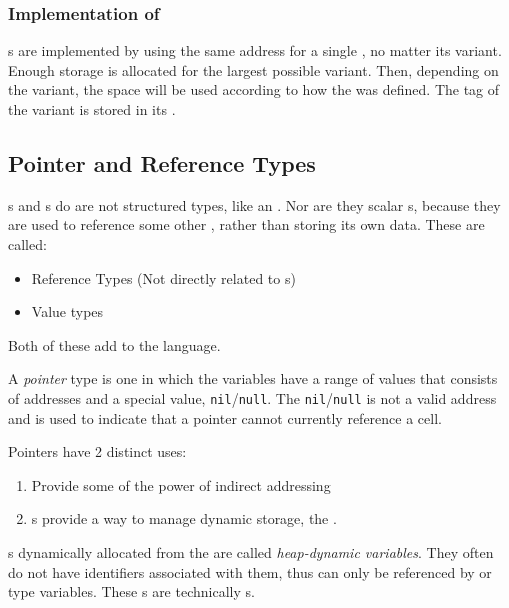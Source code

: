 \subsubsection{Implementation of }\label{subsubsec:Union_Types-Implementation}
s are implemented by using the same address for a single , no matter its variant.
Enough storage is allocated for the largest possible variant.
Then, depending on the variant, the space will be used according to how the  was defined.
The tag of the  variant is stored in its .

\subsection{Pointer and Reference Types}\label{subsec:Pointer_Reference_Types}
s and s do are not structured types, like an .
Nor are they scalar s, because they are used to reference some other , rather than storing its own data.
These are called:
\begin{itemize}[noitemsep]
\item Reference Types (Not directly related to s)
\item Value types
\end{itemize}
Both of these add  to the language.

\begin{definition}[Pointer]\label{def:Pointer}
  A \emph{pointer} type is one in which the variables have a range of values that consists of  addresses and a special value, \texttt{nil}/\texttt{null}.
  The \texttt{nil}/\texttt{null} is not a valid address and is used to indicate that a pointer cannot currently reference a  cell.

  Pointers have 2 distinct uses:
  \begin{enumerate}[noitemsep]
  \item Provide some of the power of indirect addressing
  \item {}s provide a way to manage dynamic storage, the .
  \end{enumerate}
\end{definition}

\begin{definition}\label{def:Heap_Dynamic_Variable}
  s dynamically allocated from the  are called \emph{heap-dynamic variables}.
  They often do not have identifiers associated with them, thus can only be referenced by  or  type variables.
  These s are technically s.
\end{definition}

